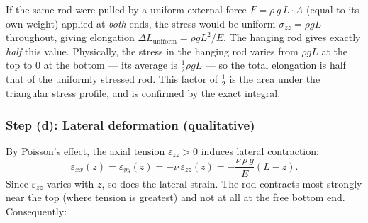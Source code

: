 \begin{remark}
    If the same rod were pulled by a uniform external force $F = \rho\, g\, L\cdot A$ (equal to its own weight) applied at \emph{both} ends, the stress would be uniform $\sigma_{zz}=\rho g L$ throughout, giving elongation $\Delta L_{\mathrm{uniform}} = \rho g L^2/E$. The hanging rod gives exactly \emph{half} this value. Physically, the stress in the hanging rod varies from $\rho g L$ at the top to $0$ at the bottom — its average is $\tfrac{1}{2}\rho g L$ — so the total elongation is half that of the uniformly stressed rod. This factor of $\tfrac{1}{2}$ is the area under the triangular stress profile, and is confirmed by the exact integral.
\end{remark}

\begin{center}
\end{center}

\subsubsection*{Step (d): Lateral deformation (qualitative)}

By Poisson's effect, the axial tension $\varepsilon_{zz}>0$ induces lateral contraction:
\begin{equation}
    \varepsilon_{xx}(z) = \varepsilon_{yy}(z) = -\nu\,\varepsilon_{zz}(z) = -\frac{\nu\,\rho\, g}{E}(L-z).
    \label{eq:rod_lateral_strain}
\end{equation}
Since $\varepsilon_{zz}$ varies with $z$, so does the lateral strain. The rod contracts most strongly near the top (where tension is greatest) and not at all at the free bottom end. Consequently:

